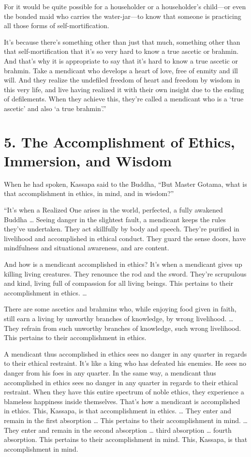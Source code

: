 \documentclass[12pt,openany]{book}%
\begin{document}
For it would be quite possible for a householder or a householder’s child—or even the bonded maid who carries the water-jar—to know that someone is practicing all those forms of self-mortification. 

It’s because there’s something other than just that much, something other than that self-mortification that it’s so very hard to know a true ascetic or brahmin. And that’s why it is appropriate to say that it’s hard to know a true ascetic or brahmin. Take a mendicant who develops a heart of love, free of enmity and ill will. And they realize the undefiled freedom of heart and freedom by wisdom in this very life, and live having realized it with their own insight due to the ending of defilements. When they achieve this, they’re called a mendicant who is a ‘true ascetic’ and also ‘a true brahmin’.” 

\section*{5. The Accomplishment of Ethics, Immersion, and Wisdom }

When he had spoken, Kassapa said to the Buddha, “But Master Gotama, what is that accomplishment in ethics, in mind, and in wisdom?” 

“It’s when a Realized One arises in the world, perfected, a fully awakened Buddha … Seeing danger in the slightest fault, a mendicant keeps the rules they’ve undertaken. They act skillfully by body and speech. They’re purified in livelihood and accomplished in ethical conduct. They guard the sense doors, have mindfulness and situational awareness, and are content. 

And how is a mendicant accomplished in ethics? It’s when a mendicant gives up killing living creatures. They renounce the rod and the sword. They’re scrupulous and kind, living full of compassion for all living beings. This pertains to their accomplishment in ethics. … 

There are some ascetics and brahmins who, while enjoying food given in faith, still earn a living by unworthy branches of knowledge, by wrong livelihood. … They refrain from such unworthy branches of knowledge, such wrong livelihood. This pertains to their accomplishment in ethics. 

A mendicant thus accomplished in ethics sees no danger in any quarter in regards to their ethical restraint. It’s like a king who has defeated his enemies. He sees no danger from his foes in any quarter. In the same way, a mendicant thus accomplished in ethics sees no danger in any quarter in regards to their ethical restraint. When they have this entire spectrum of noble ethics, they experience a blameless happiness inside themselves. That’s how a mendicant is accomplished in ethics. This, Kassapa, is that accomplishment in ethics. … They enter and remain in the first absorption … This pertains to their accomplishment in mind. … They enter and remain in the second absorption … third absorption … fourth absorption. This pertains to their accomplishment in mind. This, Kassapa, is that accomplishment in mind. 
\end{document}
